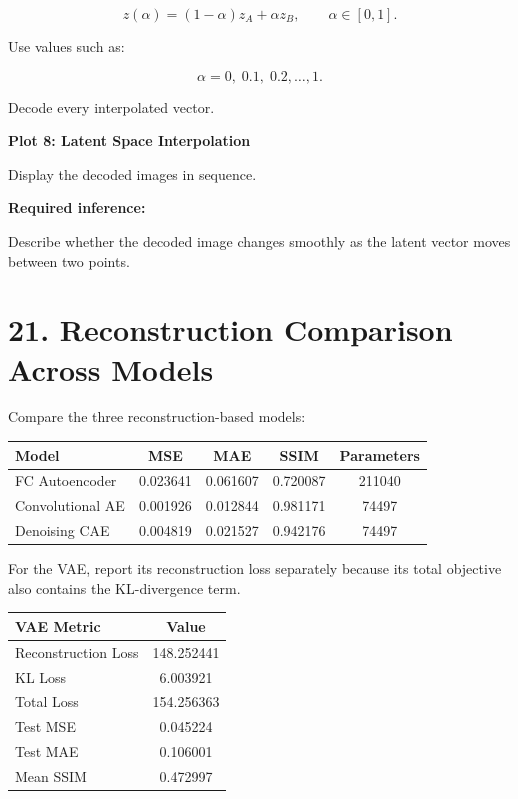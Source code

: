 \documentclass[10pt]{article}
\begin{document}
\[
z(\alpha)=(1-\alpha)z_A+\alpha z_B,
\qquad
\alpha\in[0,1].
\]

Use values such as:

\[
\alpha=
0,\;0.1,\;0.2,\ldots,1.
\]

Decode every interpolated vector.

\textbf{Plot 8: Latent Space Interpolation}

Display the decoded images in sequence.

\textbf{Required inference:}

Describe whether the decoded image changes smoothly as the latent vector moves
between two points.

\section*{21. Reconstruction Comparison Across Models}

Compare the three reconstruction-based models:

\begin{center}
\begin{tabular}{|l|c|c|c|c|}
\hline
Model & MSE & MAE & SSIM & Parameters \\
\hline
FC Autoencoder   & 0.023641 & 0.061607 & 0.720087 & 211040 \\
Convolutional AE & 0.001926 & 0.012844 & 0.981171 &  74497 \\
Denoising CAE    & 0.004819 & 0.021527 & 0.942176 &  74497 \\
\hline
\end{tabular}
\end{center}

For the VAE, report its reconstruction loss separately because its total
objective also contains the KL-divergence term.

\begin{center}
\begin{tabular}{|l|c|}
\hline
VAE Metric & Value \\
\hline
Reconstruction Loss & 148.252441 \\
KL Loss             &   6.003921 \\
Total Loss          & 154.256363 \\
Test MSE            &   0.045224 \\
Test MAE            &   0.106001 \\
Mean SSIM           &   0.472997 \\
\hline
\end{tabular}
\end{center}
\end{document}
